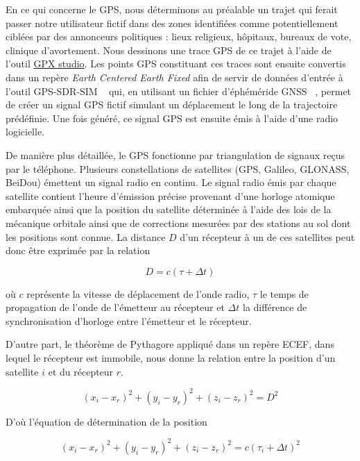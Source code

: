 \documentclass[runningheads]{llncs}
\begin{document}
En ce qui concerne le GPS, nous déterminons au préalable un trajet qui ferait passer notre utilisateur fictif dans des zones identifiées comme potentiellement ciblées par des annonceurs politiques : lieux religieux, hôpitaux, bureaux de vote, clinique d'avortement. Nous dessinons une trace GPS de ce trajet à l'aide de l'outil \href{https://gpxstudio.github.io/}{GPX studio}. Les points GPS constituant ces traces sont ensuite convertis dans un repère \textit{Earth Centered Earth Fixed} afin de servir de données d'entrée à l'outil GPS-SDR-SIM ~\cite{osqzss_osqzssgps-sdr-sim_2020} qui, en utilisant un fichier d'éphéméride GNSS ~\cite{national_aeronautics_and_space_administration_gnss_2020}, permet de créer un signal GPS fictif simulant un déplacement le long de la trajectoire prédéfinie. Une fois généré, ce signal GPS est ensuite émis à l'aide d'une radio logicielle.

De manière plus détaillée, le GPS fonctionne par triangulation de signaux reçus par le téléphone. Plusieurs constellations de satellites (GPS, Galileo, GLONASS, BeiDou) émettent un signal radio en continu. Le signal radio émis par chaque satellite contient l'heure d'émission précise provenant d'une horloge atomique embarquée ainsi que la position du satellite déterminée à l'aide des lois de la mécanique orbitale ainsi que de corrections mesurées par des stations au sol dont les positions sont connue. La distance $D$ d'un récepteur à un de ces satellites peut donc être exprimée par la relation

\begin{equation}
    D = c(\tau + \Delta t)
\end{equation}

où $c$ représente la vitesse de déplacement de l'onde radio, $\tau$ le temps de propagation de l'onde de l'émetteur au récepteur et $\Delta t$ la différence de synchronisation d'horloge entre l'émetteur et le récepteur.

D'autre part, le théorème de Pythagore appliqué dans un repère ECEF, dans lequel le récepteur est immobile, nous donne la relation entre la position d'un satellite $i$ et du récepteur $r$.

\begin{equation}
    (x_i - x_r)^2 + (y_i - y_r)^2 + (z_i - z_r)^2 = D^2
\end{equation}

D'où l'équation de détermination de la position

\begin{equation}
    (x_i - x_r)^2 + (y_i - y_r)^2 + (z_i - z_r)^2 = c(\tau_i + \Delta t)^2
    \label{eq:position_determination}
\end{equation}
\end{document}
